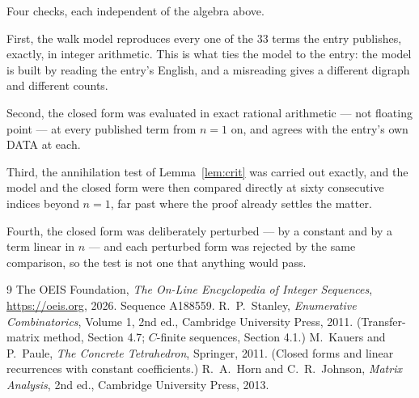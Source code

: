 \documentclass[11pt,a4paper]{article}
\theoremstyle{plain}
\theoremstyle{definition}
\begin{document}
Four checks, each independent of the algebra above.

First, the walk model reproduces every one of the $33$ terms the entry publishes,
exactly, in integer arithmetic. This is what ties the model to the entry: the model is built
by reading the entry's English, and a misreading gives a different digraph and different
counts.

Second, the closed form was evaluated in exact rational arithmetic --- not floating point ---
at every published term from $n=1$ on, and agrees with the entry's own DATA at each.

Third, the annihilation test of Lemma~\ref{lem:crit} was carried out exactly, and the model
and the closed form were then compared directly at sixty consecutive indices beyond
$n=1$, far past where the proof already settles the matter.

Fourth, the closed form was deliberately perturbed --- by a constant and by a term linear in
$n$ --- and each perturbed form was rejected by the same comparison, so the test is not one
that anything would pass.

\begin{thebibliography}{9}
 The OEIS Foundation, \emph{The On-Line Encyclopedia of Integer
Sequences}, \url{https://oeis.org}, 2026. Sequence A188559.
 R.~P.~Stanley, \emph{Enumerative Combinatorics}, Volume 1, 2nd ed.,
Cambridge University Press, 2011. (Transfer-matrix method, Section 4.7; $C$-finite sequences,
Section 4.1.)
 M.~Kauers and P.~Paule, \emph{The Concrete Tetrahedron}, Springer, 2011.
(Closed forms and linear recurrences with constant coefficients.)
 R.~A.~Horn and C.~R.~Johnson, \emph{Matrix Analysis}, 2nd ed., Cambridge
University Press, 2013.
\end{thebibliography}
\end{document}
